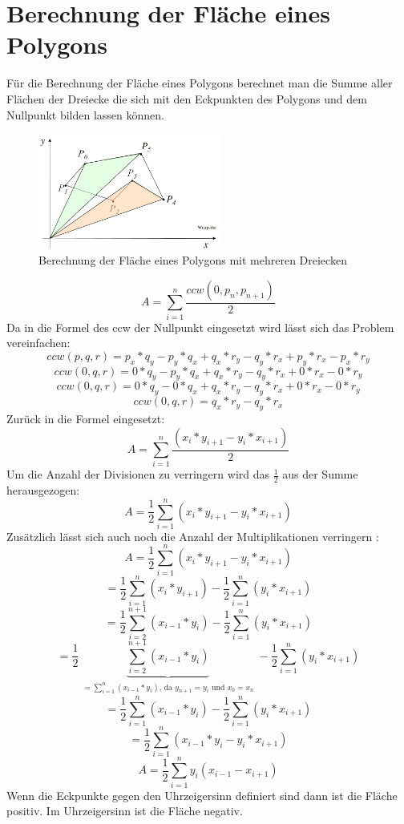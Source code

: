 \documentclass[conference]{IEEEtran}
\begin{document}
	\section{Berechnung der Fläche eines Polygons}
	Für die Berechnung der Fläche eines Polygons berechnet man die Summe aller Flächen der Dreiecke die sich mit den Eckpunkten des Polygons und dem Nullpunkt bilden lassen können.
	\begin{figure}[h]
		\begin{center}
			\includegraphics[width=6cm]{AreaPoly.png}
			\caption{Berechnung der Fläche eines Polygons mit mehreren Dreiecken}
			\label{figure_3}
		\end{center}
	\end{figure}
	\[ A = \sum_{i=1}^{n} \frac{ccw(0,p_n,p_{n+1})}{2} \]
	Da in die Formel des ccw der Nullpunkt eingesetzt wird lässt sich das Problem vereinfachen:
	\[ ccw(p,q,r) = p_x*q_y - p_y*q_x + q_x*r_y - q_y*r_x + p_y*r_x - p_x*r_y \]
	\[ ccw(0,q,r) = 0*q_y - p_y*q_x + q_x*r_y - q_y*r_x + 0*r_x - 0*r_y \]
	\[ ccw(0,q,r) = 0*q_y - 0*q_x + q_x*r_y - q_y*r_x + 0*r_x - 0*r_y \]
	\[ ccw(0,q,r) =  q_x*r_y - q_y*r_x  \]
	Zurück in die Formel eingesetzt:
	\[ A = \sum_{i=1}^{n} \frac{(x_{i}*y_{i+1}-y_{i}*x_{i+1})}{2}\]
	Um die Anzahl der Divisionen zu verringern wird das $\frac{1}{2}$ aus der Summe herausgezogen:
	\[ A= \frac{1}{2}\sum_{i=1}^{n}(x_{i}*y_{i+1}-y_{i}*x_{i+1})\]
	Zusätzlich lässt sich auch noch die Anzahl der Multiplikationen verringern \cite{b1}:
	\[ A = \frac{1}{2}\sum_{i=1}^{n}(x_{i}*y_{i+1}-y_{i}*x_{i+1})\]	
	\[ = \frac{1}{2}\sum_{i=1}^{n}(x_{i}*y_{i+1}) - \frac{1}{2}\sum_{i=1}^{n}(y_{i}*x_{i+1})\]	
	\[ = \frac{1}{2}\sum_{i=2}^{n+1}(x_{i-1}*y_{i}) - \frac{1}{2}\sum_{i=1}^{n}(y_{i}*x_{i+1})\]
	\[ = \frac{1}{2} \underbrace{\sum_{i=2}^{n+1}(x_{i-1}*y_i)}_{\substack{ = \sum_{i=1}^{n}(x_{i-1}*y_{i})  \text{, da } y_{n+1}=y_i \text{ und } x_0=x_n}} - \frac{1}{2}\sum_{i=1}^{n}(y_i*x_{i+1})\]
	\[ = \frac{1}{2} \sum_{i=1}^{n}(x_{i-1}*y_{i}) - \frac{1}{2}\sum_{i=1}^{n}(y_i*x_{i+1})\]
	\[ = \frac{1}{2}\sum_{i=1}^{n}(x_{i-1}*y_{i}-y_{i}*x_{i+1})\]
	\[ A = \frac{1}{2}\sum_{i=1}^{n} y_i(x_{i-1}-x_{i+1})\]
	Wenn die Eckpunkte gegen den Uhrzeigersinn definiert sind dann ist die Fläche positiv. Im Uhrzeigersinn ist die Fläche negativ.
	
\end{document}
